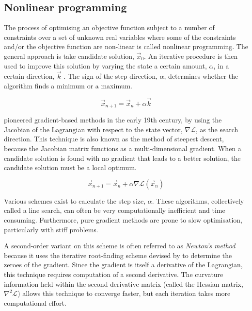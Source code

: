 \subsection{Nonlinear programming} \label{sub:NLP}

The process of optimising an objective function subject to a number of constraints over a set of unknown real variables where some of the constraints and/or the objective function are non-linear is called nonlinear programming. The general approach is take candidate solution, $\vec{x}_0$. An iterative procedure is then used to improve this solution by varying the state a certain amount, $\alpha$, in a certain direction, $\vec{k}$ \parencite{Betts1998}. The sign of the step direction, $\alpha$, determines whether the algorithm finds a minimum or a maximum.

\begin{equation} \label{eq:NLP}
\vec{x}_{n+1}=\vec{x}_n+\alpha\vec{k}
\end{equation}

\textcite{Gauss1827} pioneered gradient-based methods in the early 19th century, by using the Jacobian of the Lagrangian with respect to the state vector, $\nabla\mathcal{L}$, as the search direction. This technique is also known as the method of steepest descent, because the Jacobian matrix functions as a multi-dimensional gradient. When a candidate solution is found with no gradient that leads to a better solution, the candidate solution must be a local optimum.

\begin{equation} \label{eq:gradient-method}
\vec{x}_{n+1}=\vec{x}_n + \alpha\nabla\mathcal{L}(\vec{x}_n)
\end{equation}

Various schemes exist to calculate the step size, $\alpha$. These algorithms, collectively called a line search, can often be very computationally inefficient and time consuming. Furthermore, pure gradient methods are prone to slow optimisation, particularly with stiff problems. %

A second-order variant on this scheme is often referred to as \emph{Newton's method} because it uses the iterative root-finding scheme devised by \textcite{Newton1711, Newton1736} to determine the zeroes of the gradient. Since the gradient is itself a derivative of the Lagrangian, this technique requires computation of a second derivative. The curvature information held within the second derivative matrix (called the Hessian matrix, $\nabla^2\mathcal{L}$) allows this technique to converge faster, but each iteration takes more computational effort.

